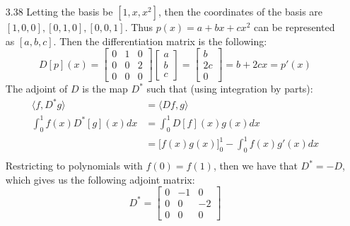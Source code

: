 \documentclass[letterpaper,12pt]{article}
\theoremstyle{definition}
\begin{document}
\begin{enumerate}
        \item[3.38]
        Letting the basis be $[1,x,x^2]$, then the coordinates of the basis are $[1,0,0], [0,1,0], [0,0,1]$. Thus $p(x) = a + bx + cx^2$ can be represented as $[a, b, c]$. Then the differentiation matrix is the following:
        \[
          D[p](x) =
          \begin{bmatrix}
            0 & 1 & 0 \\
            0 & 0 & 2 \\
            0 & 0 & 0
          \end{bmatrix}
          \begin{bmatrix}
            a \\
            b \\
            c
          \end{bmatrix}
          =
          \begin{bmatrix}
            b \\
            2c \\
            0
          \end{bmatrix}
          = b + 2cx = p'(x)
        \]
        The adjoint of $D$ is the map $D^*$ such that (using integration by parts):
        \begin{align*}
           \langle f, D^*g \rangle &= \langle Df, g \rangle \\
           \int_0^1 f(x)D^*[g](x) dx &= \int_0^1 D[f](x)g(x)dx \\
           &= \Bigg[f(x)g(x)\Bigg]_0^1 - \int_0^1 f(x)g'(x)dx \\
        \end{align*}
        Restricting to polynomials with $f(0) = f(1)$, then we have that $D^* = -D$, which gives us the following adjoint matrix:
        \[
          D^* =
          \begin{bmatrix}
            0 & -1 & 0 \\
            0 & 0 & -2 \\
            0 & 0 & 0
          \end{bmatrix}
        \]


\end{enumerate}
\end{document}
